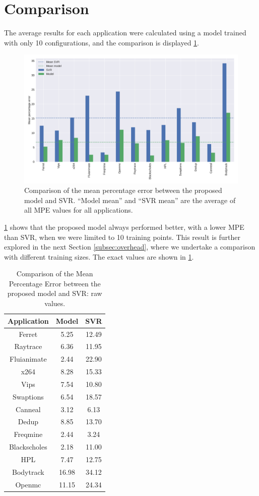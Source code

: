 \section{Comparison} \label{sec:comparison}
The average results for each application were calculated using a model trained with only 10 configurations, and the comparison is displayed \cref{fig:mpe_svr_eq}. %
\begin{figure}[H]
	\centering
	\includegraphics[width=.8\columnwidth]{models/figures/mpe_svr_eq.pdf}
	\caption{Comparison of the mean percentage error between the proposed model and SVR. ``Model mean'' and ``SVR mean'' are the average of all MPE values for all applications.
	}
	\label{fig:mpe_svr_eq}
\end{figure}

\cref{fig:mpe_svr_eq} shows that the proposed model always performed better, with a lower MPE than SVR, when we were limited to 10 training points. This result is further explored in the next Section \ref{subsec:overhead}, where we undertake a comparison with different training sizes. The exact values are shown in \cref{tab:mpe_svr_eq}.

\begin{table}[H]
\centering
\begin{tabular}{c|c|c}
\hline
Application  & Model & SVR   \\ \hline
Ferret       & 5.25     & 12.49  \\ 
Raytrace     & 6.36     & 11.95  \\
Fluianimate  & 2.44     & 22.90  \\
x264         & 8.28     & 15.33  \\
Vips         & 7.54     & 10.80  \\
Swaptions    & 6.54     & 18.57  \\
Canneal      & 3.12     & 6.13   \\
Dedup        & 8.85     & 13.70  \\
Freqmine     & 2.44     & 3.24   \\
Blackscholes & 2.18     & 11.00  \\
HPL          & 7.47     & 12.75  \\
Bodytrack    & 16.98    & 34.12  \\
Openmc       & 11.15    & 24.34  \\
\end{tabular}
\caption{Comparison of the Mean Percentage Error between the proposed model and SVR: raw values.}
\label{tab:mpe_svr_eq}
\end{table}

